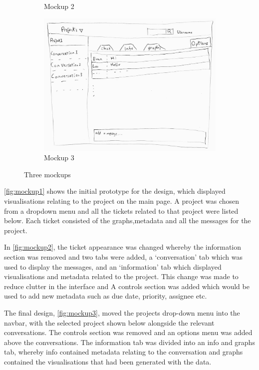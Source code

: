 \documentclass[a4paper]{l3proj}
\begin{document}
\begin{figure}[ht]
\begin{subfigure}[b]{0.3\textwidth}
		\caption{Mockup 2}
		\label{fig:mockup2} 
    \end{subfigure}
    \hfill
    \begin{subfigure}[b]{0.3\textwidth}
        \centering
		\includegraphics[width=\textwidth]{mockup3}
		\caption{Mockup 3}
		\label{fig:mockup3} 
    \end{subfigure}
    \caption{Three mockups}
    \label{fig:Three mockups}
\end{figure}

\autoref{fig:mockup1} shows the initial prototype for the design, which displayed visualisations relating to the project on the main page.  A project was chosen from a dropdown menu and all the tickets related to that project were listed below.  Each ticket consisted of the graphs,metadata and all the messages for the project.

In \autoref{fig:mockup2}, the ticket appearance was changed whereby the information section was removed and two tabs were added, a ‘conversation’ tab which was used to display the messages, and an ‘information’ tab which displayed visualisations and metadata related to the project. This change was made to reduce clutter in the interface and  A controls section was added which would be used to add new metadata such as due date, priority, assignee etc.

The final design, \autoref{fig:mockup3}, moved the projects drop-down menu into the navbar, with the selected project shown below alongside the relevant conversations.  The controls section was removed and an options menu was added above the conversations.  The information tab was divided into an info and graphs tab, whereby info contained metadata relating to the conversation and graphs contained the visualisations that had been generated with the data.
\end{document}
